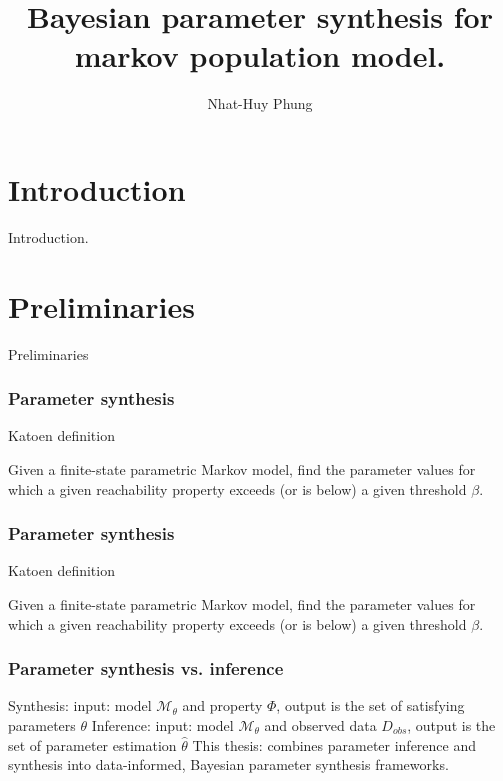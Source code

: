 \documentclass{beamer}
\title{Bayesian parameter synthesis for markov population model.}
\author{Nhat-Huy Phung}
\institute{University of Konstanz}
\begin{document}
\frame{\titlepage}
\frame{\tableofcontents}

\section{Introduction}
\begin{frame}
    \begin{center}
        \Huge Introduction.
    \end{center}
\end{frame}

\section{Preliminaries}
\begin{frame}
    \begin{center}
        \Huge Preliminaries
    \end{center}
\end{frame}


\begin{frame}
    \frametitle{Parameter synthesis}
    Katoen \cite{katoen2016probabilistic} definition
    \begin{definition}
        Given a finite-state parametric Markov model, find the parameter values for which a given
        reachability property exceeds (or is below) a given threshold $\beta$.
    \end{definition}
\end{frame}

\begin{frame}
    \frametitle{Parameter synthesis}
    Katoen \cite{katoen2016probabilistic} definition
    \begin{definition}
        Given a finite-state parametric Markov model, find the parameter values for which a given
        reachability property exceeds (or is below) a given threshold $\beta$.
    \end{definition}
\end{frame}

\begin{frame}
    \frametitle{Parameter synthesis vs. inference}
    Synthesis: input: model $\mathcal{M}_\theta$ and property $\Phi$, output is the set of satisfying parameters $\theta$
    Inference: input: model $\mathcal{M}_\theta$ and observed data $D_{obs}$, output is the set of parameter estimation $\hat{\theta}$
    This thesis: combines parameter inference and synthesis into data-informed, Bayesian parameter synthesis frameworks.
\end{frame}
\end{document}

